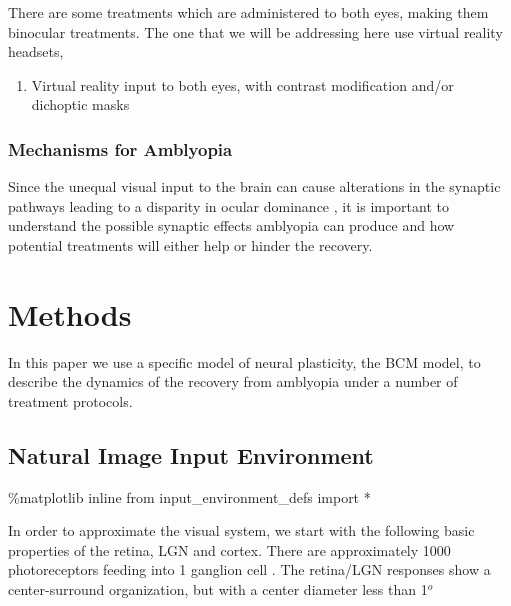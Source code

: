 \documentclass[
  letterpaper,
  number]{elsarticle}
\newenvironment{Shaded}{\begin{snugshade}}{\end{snugshade}}
\newcommand{\ImportTok}[1]{\textcolor[rgb]{0.00,0.46,0.62}{#1}}
\newcommand{\NormalTok}[1]{\textcolor[rgb]{0.00,0.23,0.31}{#1}}
\newcommand{\OperatorTok}[1]{\textcolor[rgb]{0.37,0.37,0.37}{#1}}
\providecommand{\tightlist}{%
  \setlength{\itemsep}{0pt}\setlength{\parskip}{0pt}}\usepackage{longtable,booktabs,array}
\begin{document}
There are some treatments which are administered to both eyes, making
them binocular treatments. The one that we will be addressing here use
virtual reality headsets\citep{xiao2020improved, xiao2022randomized},

\begin{enumerate}
\def\labelenumi{\arabic{enumi}.}
\setcounter{enumi}{3}
\tightlist
\item
  Virtual reality input to both eyes, with contrast modification and/or
  dichoptic masks
\end{enumerate}

\hypertarget{mechanisms-for-amblyopia}{%
\section{Mechanisms for Amblyopia}\label{mechanisms-for-amblyopia}}

Since the unequal visual input to the brain can cause alterations in the
synaptic pathways leading to a disparity in ocular dominance
\citep{birch2013amblyopia}, it is important to understand the possible
synaptic effects amblyopia can produce and how potential treatments will
either help or hinder the recovery.

\part{Methods}

In this paper we use a specific model of neural plasticity, the BCM
model\citep{BCM82}, to describe the dynamics of the recovery from
amblyopia under a number of treatment protocols.

\hypertarget{natural-image-input-environment}{%
\chapter{Natural Image Input
Environment}\label{natural-image-input-environment}}

\begin{Shaded}
\begin{Highlighting}[]
\OperatorTok{\%}\NormalTok{matplotlib inline}
\ImportTok{from}\NormalTok{ input\_environment\_defs }\ImportTok{import} \OperatorTok{*}
\end{Highlighting}
\end{Shaded}

In order to approximate the visual system, we start with the following
basic properties of the retina, LGN and cortex. There are approximately
1000 photoreceptors feeding into 1 ganglion cell
\citep{JeonEtAl1998, SterlingEtAl1988}. The retina/LGN responses show a
center-surround organization, but with a center diameter less than
1\(^o\) \citep{hubel1995eye}
\end{document}
